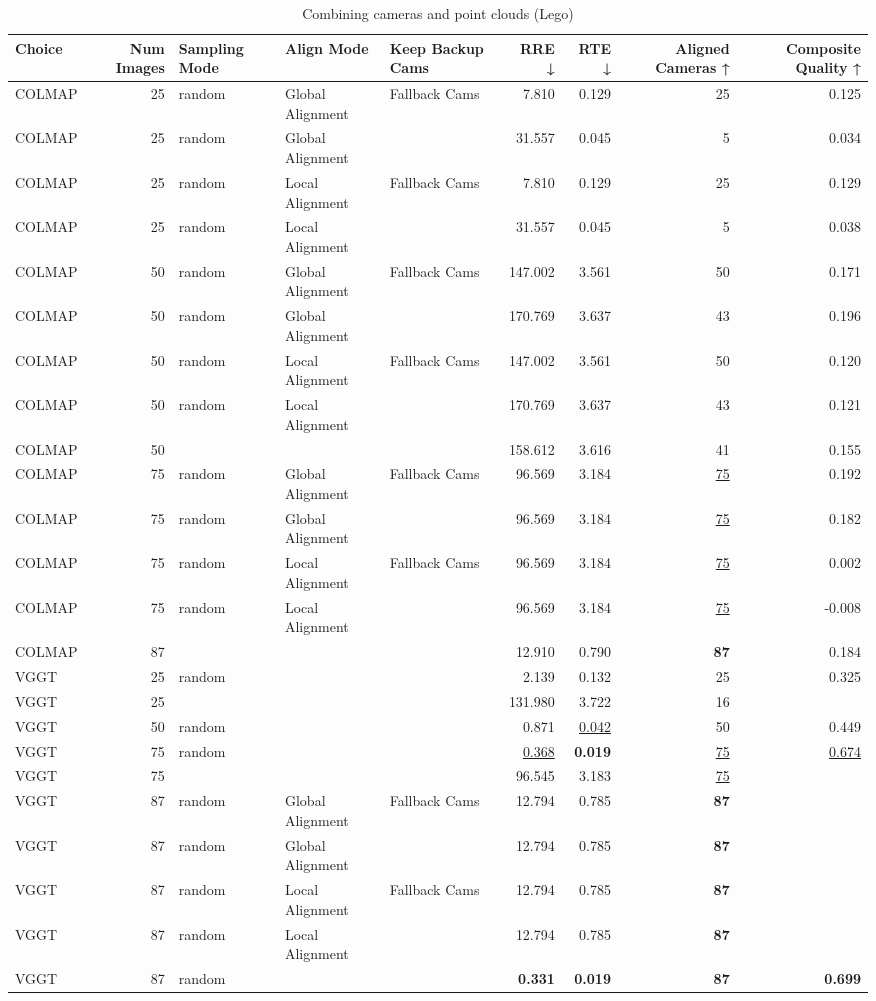 \begin{table}[H]
\caption{Combining cameras and point clouds (Lego)}
\label{tab:07_combined_align_lego}
\begin{tabular}{lrlllrrrr}
\toprule
Choice & Num Images & Sampling Mode & Align Mode & Keep Backup Cams & RRE ↓ & RTE ↓ & Aligned Cameras ↑ & Composite Quality ↑ \\
\midrule
COLMAP & 25 & random & Global Alignment & Fallback Cams & 7.810 & 0.129 & 25 & 0.125 \\
COLMAP & 25 & random & Global Alignment &  & 31.557 & 0.045 & 5 & 0.034 \\
COLMAP & 25 & random & Local Alignment & Fallback Cams & 7.810 & 0.129 & 25 & 0.129 \\
COLMAP & 25 & random & Local Alignment &  & 31.557 & 0.045 & 5 & 0.038 \\
COLMAP & 50 & random & Global Alignment & Fallback Cams & 147.002 & 3.561 & 50 & 0.171 \\
COLMAP & 50 & random & Global Alignment &  & 170.769 & 3.637 & 43 & 0.196 \\
COLMAP & 50 & random & Local Alignment & Fallback Cams & 147.002 & 3.561 & 50 & 0.120 \\
COLMAP & 50 & random & Local Alignment &  & 170.769 & 3.637 & 43 & 0.121 \\
COLMAP & 50 &  &  &  & 158.612 & 3.616 & 41 & 0.155 \\
COLMAP & 75 & random & Global Alignment & Fallback Cams & 96.569 & 3.184 & \underline{75} & 0.192 \\
COLMAP & 75 & random & Global Alignment &  & 96.569 & 3.184 & \underline{75} & 0.182 \\
COLMAP & 75 & random & Local Alignment & Fallback Cams & 96.569 & 3.184 & \underline{75} & 0.002 \\
COLMAP & 75 & random & Local Alignment &  & 96.569 & 3.184 & \underline{75} & -0.008 \\
COLMAP & 87 &  &  &  & 12.910 & 0.790 & \textbf{87} & 0.184 \\
VGGT & 25 & random &  &  & 2.139 & 0.132 & 25 & 0.325 \\
VGGT & 25 &  &  &  & 131.980 & 3.722 & 16 &  \\
VGGT & 50 & random &  &  & 0.871 & \underline{0.042} & 50 & 0.449 \\
VGGT & 75 & random &  &  & \underline{0.368} & \textbf{0.019} & \underline{75} & \underline{0.674} \\
VGGT & 75 &  &  &  & 96.545 & 3.183 & \underline{75} &  \\
VGGT & 87 & random & Global Alignment & Fallback Cams & 12.794 & 0.785 & \textbf{87} &  \\
VGGT & 87 & random & Global Alignment &  & 12.794 & 0.785 & \textbf{87} &  \\
VGGT & 87 & random & Local Alignment & Fallback Cams & 12.794 & 0.785 & \textbf{87} &  \\
VGGT & 87 & random & Local Alignment &  & 12.794 & 0.785 & \textbf{87} &  \\
VGGT & 87 & random &  &  & \textbf{0.331} & \textbf{0.019} & \textbf{87} & \textbf{0.699} \\
\bottomrule
\end{tabular}
\end{table}
